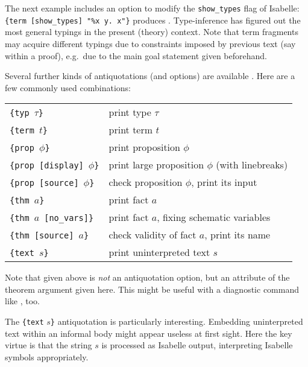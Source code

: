 \begin{isabellebody}
\begin{isamarkuptext}
  \medskip The next example includes an option to modify the
  \verb,show_types, flag of Isabelle:
  \texttt{{\at}}\verb,{term [show_types] "%x y. x"}, produces .  Type-inference has figured out the most
  general typings in the present (theory) context.  Note that term
  fragments may acquire different typings due to constraints imposed
  by previous text (say within a proof), e.g.\ due to the main goal
  statement given beforehand.

  \medskip Several further kinds of antiquotations (and options) are
  available \cite{isabelle-sys}.  Here are a few commonly used
  combinations:

  \medskip

  \begin{tabular}{ll}
  \texttt{\at}\verb,{typ,~$\tau$\verb,}, & print type $\tau$ \\
  \texttt{\at}\verb,{term,~$t$\verb,}, & print term $t$ \\
  \texttt{\at}\verb,{prop,~$\phi$\verb,}, & print proposition $\phi$ \\
  \texttt{\at}\verb,{prop [display],~$\phi$\verb,}, & print large proposition $\phi$ (with linebreaks) \\
  \texttt{\at}\verb,{prop [source],~$\phi$\verb,}, & check proposition $\phi$, print its input \\
  \texttt{\at}\verb,{thm,~$a$\verb,}, & print fact $a$ \\
  \texttt{\at}\verb,{thm,~$a$~\verb,[no_vars]}, & print fact $a$, fixing schematic variables \\
  \texttt{\at}\verb,{thm [source],~$a$\verb,}, & check validity of fact $a$, print its name \\
  \texttt{\at}\verb,{text,~$s$\verb,}, & print uninterpreted text $s$ \\
  \end{tabular}

  \medskip

  Note that  given above is \emph{not} an
  antiquotation option, but an attribute of the theorem argument given
  here.  This might be useful with a diagnostic command like
  , too.

  \medskip The \texttt{\at}\verb,{text, $s$\verb,}, antiquotation is
  particularly interesting.  Embedding uninterpreted text within an
  informal body might appear useless at first sight.  Here the key
  virtue is that the string $s$ is processed as Isabelle output,
  interpreting Isabelle symbols appropriately.


\end{isamarkuptext}
\end{isabellebody}
